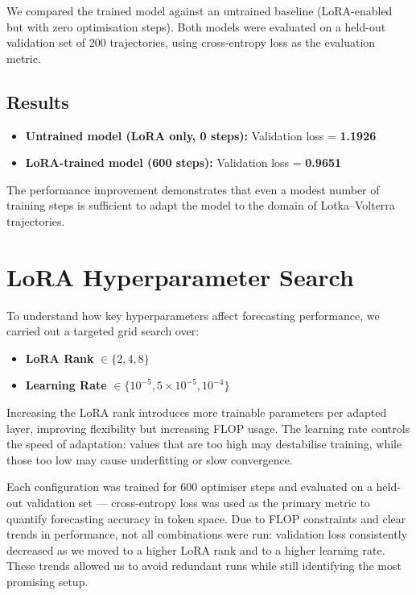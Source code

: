 \documentclass[a4paper,12pt]{article}
\begin{document}
We compared the trained model against an untrained baseline (LoRA-enabled but with zero optimisation steps). Both models were evaluated on a held-out validation set of 200 trajectories, using cross-entropy loss as the evaluation metric.

\subsection*{Results}

\begin{itemize}
    \item \textbf{Untrained model (LoRA only, 0 steps):} Validation loss = \textbf{1.1926}
    \item \textbf{LoRA-trained model (600 steps):} Validation loss = \textbf{0.9651}
\end{itemize}

The performance improvement demonstrates that even a modest number of training steps is sufficient to adapt the model to the domain of Lotka–Volterra trajectories.

\section{LoRA Hyperparameter Search}

To understand how key hyperparameters affect forecasting performance, we carried out a targeted grid search over:
\begin{itemize}
    \item \textbf{LoRA Rank} $\in \{2, 4, 8\}$
    \item \textbf{Learning Rate} $\in \{10^{-5}, 5 \times 10^{-5}, 10^{-4}\}$
\end{itemize}

Increasing the LoRA rank introduces more trainable parameters per adapted layer, improving flexibility but increasing FLOP usage. The learning rate controls the speed of adaptation: values that are too high may destabilise training, while those too low may cause underfitting or slow convergence.

Each configuration was trained for 600 optimiser steps and evaluated on a held-out validation set — cross-entropy loss was used as the primary metric to quantify forecasting accuracy in token space. Due to FLOP constraints and clear trends in performance, not all combinations were run: validation loss consistently decreased as we moved to a higher LoRA rank and to a higher learning rate. These trends allowed us to avoid redundant runs while still identifying the most promising setup.
\end{document}
